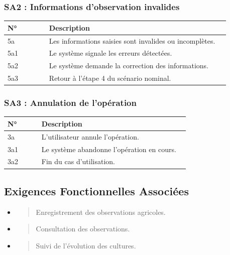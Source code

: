 \hypertarget{sa2-informations-dobservation-invalides}{%
\subsubsection{SA2 : Informations d'observation
invalides}\label{sa2-informations-dobservation-invalides}}

\begin{longtable}{@{}p{0.18\linewidth}p{0.78\linewidth}@{}}
\toprule
\rowcolors{2}{gray!10}{white}
\textbf{N°} & \textbf{Description} \\
\midrule
\endhead
5a & Les informations saisies sont invalides ou incomplètes. \\
5a1 & Le système signale les erreurs détectées. \\
5a2 & Le système demande la correction des informations. \\
5a3 & Retour à l'étape 4 du scénario nominal. \\
\bottomrule
\end{longtable}

\hypertarget{sa3-annulation-de-lopuxe9ration-1}{%
\subsubsection{SA3 : Annulation de
l'opération}\label{sa3-annulation-de-lopuxe9ration-1}}

\begin{longtable}{@{}p{0.18\linewidth}p{0.78\linewidth}@{}}
\toprule
\rowcolors{2}{gray!10}{white}
\textbf{N°} & \textbf{Description} \\
\midrule
\endhead
3a & L'utilisateur annule l'opération. \\
3a1 & Le système abandonne l'opération en cours. \\
3a2 & Fin du cas d'utilisation. \\
\bottomrule
\end{longtable}

\hypertarget{exigences-fonctionnelles-associuxe9es-2}{%
\subsection{Exigences Fonctionnelles
Associées}\label{exigences-fonctionnelles-associuxe9es-2}}

\begin{itemize}
\item
  \begin{quote}
  Enregistrement des observations agricoles.
  \end{quote}
\item
  \begin{quote}
  Consultation des observations.
  \end{quote}
\item
  \begin{quote}
  Suivi de l'évolution des cultures.
  \end{quote}
\end{itemize}


